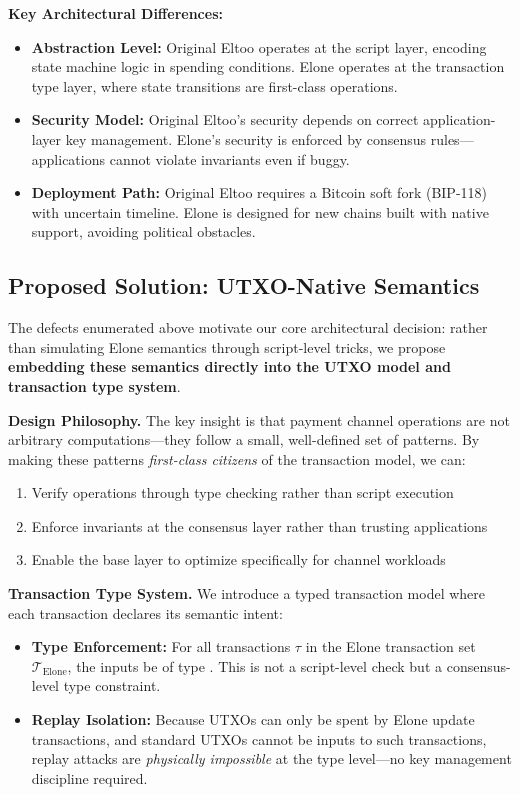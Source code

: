 \textbf{Key Architectural Differences:}
\begin{itemize}
    \item \textbf{Abstraction Level:} Original Eltoo operates at the script layer, encoding state machine logic in spending conditions. Elone operates at the transaction type layer, where state transitions are first-class operations.
    
    \item \textbf{Security Model:} Original Eltoo's security depends on correct application-layer key management. Elone's security is enforced by consensus rules---applications cannot violate invariants even if buggy.
    
    \item \textbf{Deployment Path:} Original Eltoo requires a Bitcoin soft fork (BIP-118) with uncertain timeline. Elone is designed for new chains built with native support, avoiding political obstacles.
\end{itemize}

\subsection{Proposed Solution: UTXO-Native Semantics}

The defects enumerated above motivate our core architectural decision: rather than simulating Elone semantics through script-level tricks, we propose \textbf{embedding these semantics directly into the UTXO model and transaction type system}.

\textbf{Design Philosophy.} The key insight is that payment channel operations are not arbitrary computations---they follow a small, well-defined set of patterns. By making these patterns \textit{first-class citizens} of the transaction model, we can:
\begin{enumerate}
    \item Verify operations through type checking rather than script execution
    \item Enforce invariants at the consensus layer rather than trusting applications
    \item Enable the base layer to optimize specifically for channel workloads
\end{enumerate}

\textbf{Transaction Type System.} We introduce a typed transaction model where each transaction declares its semantic intent:
\begin{itemize}
    \item \textbf{Type Enforcement:} For all transactions $\tau$ in the Elone transaction set $\mathcal{T}_{\mathrm{Elone}}$, the inputs  be of type . This is not a script-level check but a consensus-level type constraint.
    
    \item \textbf{Replay Isolation:} Because  UTXOs can only be spent by Elone update transactions, and standard UTXOs cannot be inputs to such transactions, replay attacks are \textit{physically impossible} at the type level---no key management discipline required.
\end{itemize}

